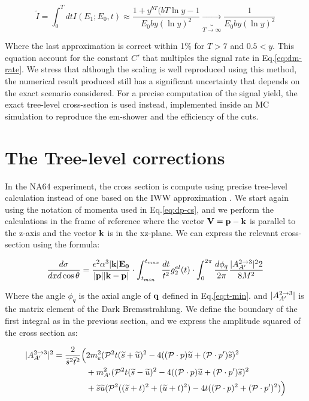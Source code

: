 \begin{equation}
  \label{eq:i-int}
  \widetilde{I} = \int^T_0 dt I(E_1; E_0, t) \approx \frac{1 + y^{bT}(bT\ln{y} - 1}{E_0by(\ln{y})^2} \underbrace{\to}_{T \to \infty} \frac{1}{E_0by(\ln{y})^2}
\end{equation}

Where the last approximation is correct within 1\% for $T>7$ and $0.5 < y$. This equation account for the constant $C'$ that multiples the signal rate in Eq.\ref{eq:dm-rate}. We stress that although the scaling is well reproduced using this method, the numerical result produced still has a significant uncertainty that depends on the exact scenario considered. For a precise computation of the signal yield, the exact tree-level cross-section is used instead, implemented inside an MC simulation to reproduce the em-shower and the efficiency of the cuts.



\section{The Tree-level corrections}
\label{appA:sec:cross-section-tl}

In the NA64 experiment, the cross section is compute using precise tree-level calculation instead of one based on the IWW approximation \cite{DMsimulation}. We start again using the notation of momenta used in Eq.\ref{eq:dp-cs}, and we perform the calculations in the frame of reference where the vector $\bf{V} = \bf{p} - \bf{k}$ is parallel to the z-axis and the vector $\bf{k}$ is in the xz-plane. We can express the relevant cross-section using the formula:

\begin{equation}
  \label{eq:cs-tl}
  \frac{d\sigma}{dx d\cos{\theta}} = \frac{\epsilon^2 \alpha^3 |\bf{k}| E_0}{|\bf{p}| |\bf{k} - \bf{p}|} \cdot \int_{t_{min}}^{t_{max}} \frac{dt}{t^2} g^{el}_{2}(t) \cdot \int_0^{2\pi} \frac{d\phi_q}{2\pi} \frac{|A^{2 \to 3}_{A'}|^22}{8 M^2}
\end{equation}

Where the angle $\phi_q$ is the axial angle of $\bf{q}$ defined in Eq.\ref{eq:t-min}. and $|A^{2 \to 3}_{A'}|$ is the matrix element of the Dark Bremsstrahlung. We define the boundary of the first integral as in the previous section, and we express the amplitude squared of the cross section as:

\begin{equation}
  \label{eq:cs-dp-amp}
  \begin{aligned}
    |A^{2 \to 3}_{A'}|^2 = \frac{2}{\widetilde{s}^2\widetilde{t}^2} \Big( &2m^2_e (\mathcal{P}^2 t (\widetilde{s} + \widetilde{u})^2 - 4((\mathcal{P} \cdot p)\widetilde{u} + (\mathcal{P} \cdot p')\widetilde{s})^2  \\
      &+ m^2_{A'}(\mathcal{P}^2 t (\widetilde{s} - \widetilde{u})^2 -4((\mathcal{P}\cdot p)\widetilde{u} + (\mathcal{P}\cdot p')\widetilde{s})^2 \\
      &+ \widetilde{s}\widetilde{u}(\mathcal{P}^2 ((\widetilde{s} + t)^2 + (\widetilde{u}+t)^2) - 4 t ((\mathcal{P} \cdot p)^2 + (\mathcal{P} \cdot p')^2) \Big)
  \end{aligned}    
\end{equation}

